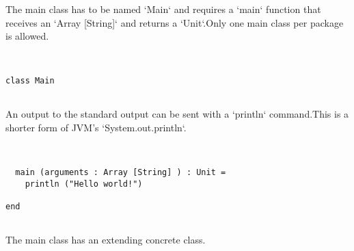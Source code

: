 \documentclass[12pt,a4paper]{article}
\begin{document}
The main class has to be named `Main` and requires a `main` function that receives an `Array [String]` and returns a `Unit`.Only one main class per package is allowed. 


\begin{lstlisting}


class Main


\end{lstlisting}

An output to the standard output can be sent with a `println` command.This is a shorter form of JVM's `System.out.println`. 


\begin{lstlisting}


  main (arguments : Array [String] ) : Unit =
    println ("Hello world!")

end


\end{lstlisting}

The main class has an extending concrete class. 


\begin{lstlisting}


\end{lstlisting}
\end{document}
